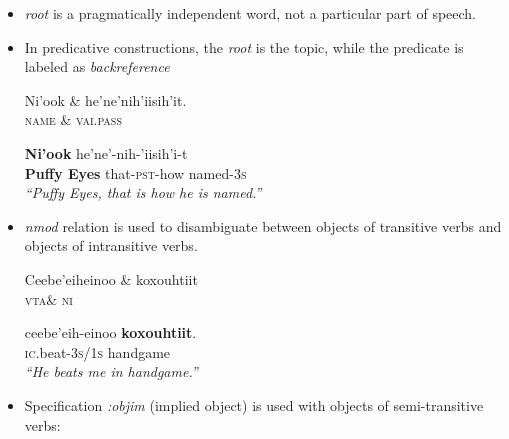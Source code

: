\documentclass[portrait,a0paper,fontscale=0.36]{baposter} %
\newcommand{\compresslist}{ %
\setlength{\itemsep}{1pt}
\setlength{\parskip}{0pt}
\setlength{\parsep}{0pt}
}
\begin{document}
\begin{poster}
{\begin{itemize}
\normalsize
\end{itemize}
}
{
\begin{itemize} \compresslist
\item \textit{root} is a pragmatically independent word, not a particular part of speech.
\item In predicative constructions, the \textit{root} is the topic, while the predicate is labeled as \textit{backreference}
\begin{exe}
\ex \label{topic}
\footnotesize
\begin{dependency}
\begin{deptext}
Ni'ook \& he'ne'nih'iisih'it.\\
\textsc{name} \& \textsc{vai.pass}\\
\end{deptext}
\end{dependency}
\gll \textbf{{Ni'ook}} {he'ne'-nih-'iisih'i-t}\\
\textbf{{Puffy Eyes}} {that-\textsc{pst}-how named-\textsc{3s}}\\
\trans \textit{``Puffy Eyes, that is how he is named.''}

\end{exe}
\normalsize

\end{itemize}
}


{
\begin{itemize} \compresslist
\item \textit{nmod} relation is used to disambiguate between objects of transitive verbs and objects of intransitive verbs. 
\small
\begin{exe}
\ex \label{handgame} 
\begin{dependency}
\begin{deptext}
Ceebe'eiheinoo \& koxouhtiit\\
\textsc{vta}\& \textsc{ni}\\
\end{deptext}
\end{dependency}
\gll ceebe'eih-einoo \textbf{koxouhtiit}.\\
\textsc{ic}.beat-\textsc{3s/1s} handgame\\
\trans \textit{``He beats me in handgame.''}
\end{exe}
\normalsize
\item Specification \textit{:objim} (implied object) is used with objects of semi-transitive verbs:


\end{itemize}}
\end{poster}
\end{document}

